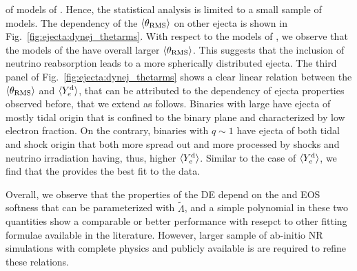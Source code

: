of models of \citet{Radice:2018pdn}. 
Hence, the statistical analysis is limited 
to a small sample of models. The dependency of the $\langle\theta_{\rm RMS}\rangle$ on other ejecta is shown in Fig.~\ref{fig:ejecta:dynej_thetarms}.
%
With respect to the models of \citet{Radice:2018pdn}, we observe that the models of the 
\DSrefset{} have overall larger $\langle\theta_{\rm RMS}\rangle$. This suggests that the inclusion of 
neutrino reabsorption leads to a more spherically distributed ejecta.
%
The third panel of Fig.~\ref{fig:ejecta:dynej_thetarms} shows a clear linear relation 
between the $\langle\theta_{\rm RMS}\rangle$ and $\langle Y^{\text{d}}_{e}\rangle$, that can be attributed to the \mr{} dependency of 
ejecta properties observed before, that we extend as follows. 
Binaries with large \mr{} have ejecta of mostly tidal origin that 
is confined to the binary plane and characterized by low electron fraction. On the 
contrary, binaries with $q\sim 1$ have ejecta of both tidal and shock origin that both 
more spread out and more processed by shocks and neutrino irradiation having, thus,
higher $\langle Y^{\text{d}}_{e}\rangle$. 
%
Similar to the case of $\langle Y^{\text{d}}_{e}\rangle$, we find that the \polql{} provides the best fit to the data.

Overall, we observe that the properties of the \ac{DE} depend on the \mr{} and 
\ac{EOS} softness that can be parameterized with $\tilde{\Lambda}$, and a simple 
polynomial in these two quantities show a comparable or better performance with 
resepct to other fitting formulae available in the literature. 
%
However, larger sample of ab-initio \ac{NR} simulations with complete physics and 
publicly available is are required to refine these relations.


